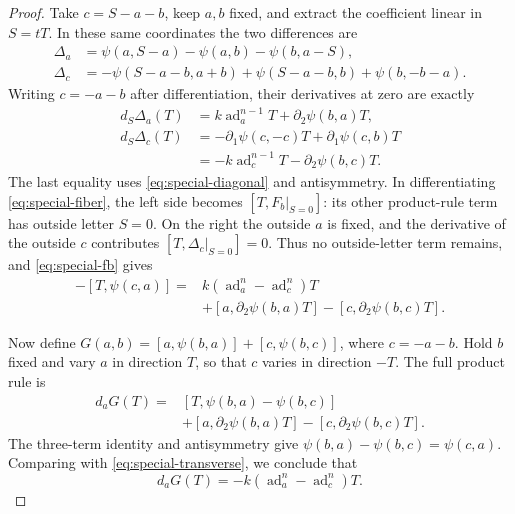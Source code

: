 \documentclass[11pt]{article}
\theoremstyle{definition}
\theoremstyle{remark}
\numberwithin{equation}{section}
\begin{document}
\begin{proof}
Take \(c=S-a-b\), keep \(a,b\) fixed, and extract the coefficient
linear in \(S=tT\).  In these same coordinates the two differences
are
\begin{align*}
 \Delta_a&=\psi(a,S-a)-\psi(a,b)-\psi(b,a-S),\\
 \Delta_c&=-\psi(S-a-b,a+b)+\psi(S-a-b,b)+\psi(b,-b-a).
\end{align*}
Writing \(c=-a-b\) after differentiation, their derivatives at zero
are exactly
\begin{align*}
 d_S\Delta_a(T)
   &=k\operatorname{ad}_a^{n-1}T+\partial_2\psi(b,a)T,\\
 d_S\Delta_c(T)
   &=-\partial_1\psi(c,-c)T+\partial_1\psi(c,b)T\\
   &=-k\operatorname{ad}_c^{n-1}T-\partial_2\psi(b,c)T.
\end{align*}
The last equality uses \eqref{eq:special-diagonal} and
antisymmetry.  In differentiating \eqref{eq:special-fiber}, the left
side becomes \([T,F_b|_{S=0}]\): its other product-rule term has
outside letter \(S=0\).  On the right the outside \(a\) is fixed,
and the derivative of the outside \(c\) contributes
\([T,\Delta_c|_{S=0}]=0\).  Thus no outside-letter term remains,
and \eqref{eq:special-fb} gives
\begin{equation}\label{eq:special-transverse}
 \begin{split}
 -[T,\psi(c,a)]={}&k(\operatorname{ad}_a^n-\operatorname{ad}_c^n)T\\
 &+[a,\partial_2\psi(b,a)T]
       -[c,\partial_2\psi(b,c)T].
 \end{split}
\end{equation}

Now define
\(G(a,b)=[a,\psi(b,a)]+[c,\psi(b,c)]\), where \(c=-a-b\).
Hold \(b\) fixed and vary \(a\) in direction \(T\), so that \(c\)
varies in direction \(-T\).  The full product rule is
\begin{align*}
 d_aG(T)={}&[T,\psi(b,a)-\psi(b,c)]\\
           &+[a,\partial_2\psi(b,a)T]
              -[c,\partial_2\psi(b,c)T].
\end{align*}
The three-term identity and antisymmetry give
\(\psi(b,a)-\psi(b,c)=\psi(c,a)\).  Comparing with
\eqref{eq:special-transverse}, we conclude that
\begin{equation}\label{eq:special-dg}
 d_aG(T)=-k(\operatorname{ad}_a^n-\operatorname{ad}_c^n)T.
\end{equation}


\end{proof}
\end{document}
